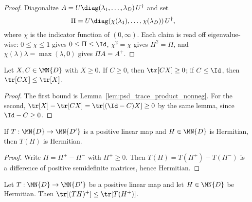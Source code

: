 \begin{proof}\leanok
    Diagonalize
    $A=U\diag(\lambda_1,\ldots,\lambda_D)\,U^\dagger$ and set
    \begin{align}
        \Pi
        &=U\diag
        (\chi(\lambda_1),\ldots,\chi(\lambda_D))\,U^\dagger,
        \notag
    \end{align}
    where $\chi$ is the indicator function of $(0,\infty)$. Each claim is
    read off eigenvalue-wise: $0\leq\chi\leq1$ gives
    $0\leq\Pi\leq\Id$, $\chi^2=\chi$ gives $\Pi^2=\Pi$, and
    $\chi(\lambda) \lambda=\max(\lambda,0)$ gives $\Pi A=A^+$.
\end{proof}

\begin{lemma}
    \label{lem:psd_trace_pairing_bounds}
    \leanok
    Let $X,C\in\MN{D}$ with $X\geq0$. If $C\geq0$, then
    $\tr[CX]\geq0$; if $C\leq\Id$, then
    $\tr[CX]\leq\tr[X]$.
\end{lemma}

\begin{proof}\leanok
    The first bound is Lemma~\ref{lem:psd_trace_product_nonneg}. For the
    second, $\tr[X]-\tr[CX]=\tr[(\Id-C)X]\geq0$
    by the same lemma, since $\Id-C\geq0$.
\end{proof}

\begin{lemma}
    \label{lem:positive_map_hermitian}
    \leanok
    If $T:\MN{D}\to\MN{D'}$ is a positive linear map and $H\in\MN{D}$ is
    Hermitian, then $T(H)$ is Hermitian.
\end{lemma}

\begin{proof}\leanok
    Write $H=H^+-H^-$ with $H^\pm\geq0$. Then $T(H)=T(H^+)-T(H^-)$ is a
    difference of positive semidefinite matrices, hence Hermitian.
\end{proof}

\begin{lemma}
    \label{lem:posPart_support_projection_estimate}
    \leanok
    Let $T:\MN{D}\to\MN{D'}$ be a positive linear map and let
    $H\in\MN{D}$ be Hermitian.  Then
    $\tr[(TH)^+]\leq\tr[T(H^+)]$.
\end{lemma}

